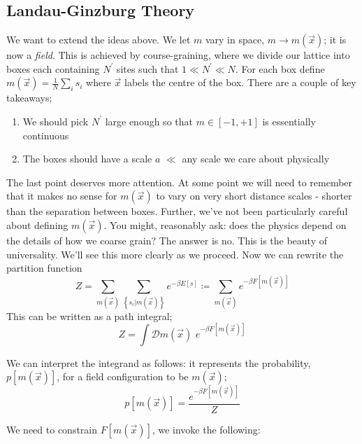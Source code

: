 \subsection{Landau-Ginzburg Theory}
We want to extend the ideas above. We let $m$ vary in space, $m \rightarrow m(\vec x)$; it is now a \emph{field}. This is achieved by course-graining, where we divide our lattice into boxes each containing $N^{\prime}$ sites such that $1 \ll N^{\prime} \ll N$. For each box define $m(\vec x) = \tfrac{1}{N} \sum_{i}{s_i}$ where $\vec x$ labels the centre of the box. There are a couple of key takeaways;
\begin{enumerate}
\item We should pick $N^{\prime}$ large enough so that $m \in \left[-1, +1\right]$ is essentially continuous
\item The boxes should have a scale $a$ $\ll$ any scale we care about physically
\end{enumerate}
The last point deserves more attention. At some point we will need to remember that it makes no sense for $m(\vec x)$ to vary on very short distance scales - shorter than the separation between boxes. Further, we've not been particularly careful about defining $m(\vec x)$. You might, reasonably ask: does the physics depend on the details of how we coarse grain? The answer is no. This is the beauty of universality. We'll see this more clearly as we proceed. Now we can rewrite the partition function
\begin{equation}
Z = \sum_{m(\vec x)}{ \sum_{\left\{s_i | m(\vec x)\right\}}{e^{-\beta E[s]}} } \coloneqq \sum_{m(\vec x)}{e^{-\beta F[m(\vec x)]}}
\end{equation}
This can be written as a path integral;
\begin{equation}
Z = \int{ \mathcal{D}m(\vec x) \,\, e^{-\beta F[m(\vec x)]} }
\end{equation}
\begin{definitionbox}
We can interpret the integrand as follows: it represents the probability, $p[m(\vec x)]$, for a field configuration to be $m(\vec x)$;
\begin{equation}
p[m(\vec x)] = \frac{e^{-\beta F[m(\vec x)]}}{Z}
\end{equation}
\end{definitionbox}
We need to constrain $F[m(\vec x)]$, we invoke the following:
